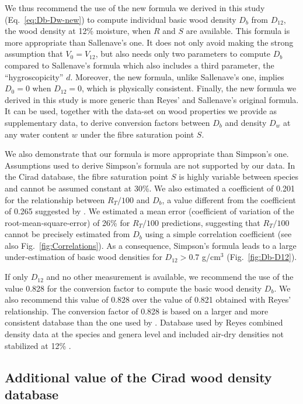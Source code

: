 \documentclass[a4paper, 12pt, leqno, dvipsnames]{article}\usepackage[]{graphicx}\usepackage[]{color}
\begin{document}
We thus recommend the use of the new formula we derived in this study (Eq.~\ref{eq:Db-Dw-new}) to compute individual basic wood density $D_{b}$ from $D_{12}$, the wood density at 12\% moisture, when $R$ and $S$ are available. This formula is more appropriate than Sallenave's one. It does not only avoid making the strong assumption that $V_0=V_{12}$, but also needs only two parameters to compute $D_b$ compared to Sallenave's formula which also includes a third parameter, the ``hygroscopicity'' $d$. Moreover, the new formula, unlike Sallenave's one, implies $D_0=0$ when $D_{12}=0$, which is physically consistent. Finally, the new formula we derived in this study is more generic than Reyes' and Sallenave's original formula. It can be used, together with the data-set on wood properties we provide as supplementary data, to derive conversion factors between $D_b$ and density $D_w$ at any water content $w$ under the fibre saturation point $S$.

We also demonstrate that our formula is more appropriate than Simpson's one. Assumptions used to derive Simpson's formula are not supported by our data. In the Cirad database, the fibre saturation point $S$ is highly variable between species and cannot be assumed constant at 30\%. We also estimated a coefficient of 0.201 for the relationship between $R_T/100$ and $D_b$, a value different from the coefficient of 0.265 suggested by \citet{Stamm1964}. We estimated a mean error (coefficient of variation of the root-mean-square-error) of 26\% for $R_T/100$ predictions, suggesting that $R_T/100$ cannot be precisely estimated from $D_b$ using a simple correlation coefficient (see also Fig.~\ref{fig:Correlations}). As a consequence, Simpson's formula leads to a large under-estimation of basic wood densities for $D_{12}>0.7$ g/cm$^3$ (Fig.~\ref{fig:Db-D12}).

If only $D_{12}$ and no other measurement is available, we recommend the use of the value 0.828 for the conversion factor to compute the basic wood density $D_b$. We also recommend this value of 0.828 over the value of 0.821 obtained with Reyes' relationship. The conversion factor of 0.828 is based on a larger and more consistent database than the one used by \citet{Reyes1992}. Database used by Reyes combined density data at the species and genera level and included air-dry densities not stabilized at 12\% \citep{Chudnoff1984}. 

\subsection{Additional value of the Cirad wood density database}
\end{document}
